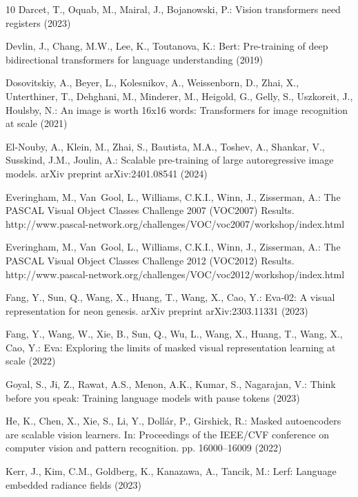 \documentclass[runningheads]{llncs}
\begin{document}
\begin{thebibliography}{10}
Darcet, T., Oquab, M., Mairal, J., Bojanowski, P.: Vision transformers need registers (2023)

Devlin, J., Chang, M.W., Lee, K., Toutanova, K.: Bert: Pre-training of deep bidirectional transformers for language understanding (2019)

Dosovitskiy, A., Beyer, L., Kolesnikov, A., Weissenborn, D., Zhai, X., Unterthiner, T., Dehghani, M., Minderer, M., Heigold, G., Gelly, S., Uszkoreit, J., Houlsby, N.: An image is worth 16x16 words: Transformers for image recognition at scale (2021)

El-Nouby, A., Klein, M., Zhai, S., Bautista, M.A., Toshev, A., Shankar, V., Susskind, J.M., Joulin, A.: Scalable pre-training of large autoregressive image models. arXiv preprint arXiv:2401.08541  (2024)

Everingham, M., Van~Gool, L., Williams, C.K.I., Winn, J., Zisserman, A.: The {PASCAL} {V}isual {O}bject {C}lasses {C}hallenge 2007 {(VOC2007)} {R}esults. http://www.pascal-network.org/challenges/VOC/voc2007/workshop/index.html

Everingham, M., Van~Gool, L., Williams, C.K.I., Winn, J., Zisserman, A.: The {PASCAL} {V}isual {O}bject {C}lasses {C}hallenge 2012 {(VOC2012)} {R}esults. http://www.pascal-network.org/challenges/VOC/voc2012/workshop/index.html

Fang, Y., Sun, Q., Wang, X., Huang, T., Wang, X., Cao, Y.: Eva-02: A visual representation for neon genesis. arXiv preprint arXiv:2303.11331  (2023)

Fang, Y., Wang, W., Xie, B., Sun, Q., Wu, L., Wang, X., Huang, T., Wang, X., Cao, Y.: Eva: Exploring the limits of masked visual representation learning at scale (2022)

Goyal, S., Ji, Z., Rawat, A.S., Menon, A.K., Kumar, S., Nagarajan, V.: Think before you speak: Training language models with pause tokens (2023)

He, K., Chen, X., Xie, S., Li, Y., Doll{\'a}r, P., Girshick, R.: Masked autoencoders are scalable vision learners. In: Proceedings of the IEEE/CVF conference on computer vision and pattern recognition. pp. 16000--16009 (2022)

Kerr, J., Kim, C.M., Goldberg, K., Kanazawa, A., Tancik, M.: Lerf: Language embedded radiance fields (2023)


\end{thebibliography}
\end{document}
